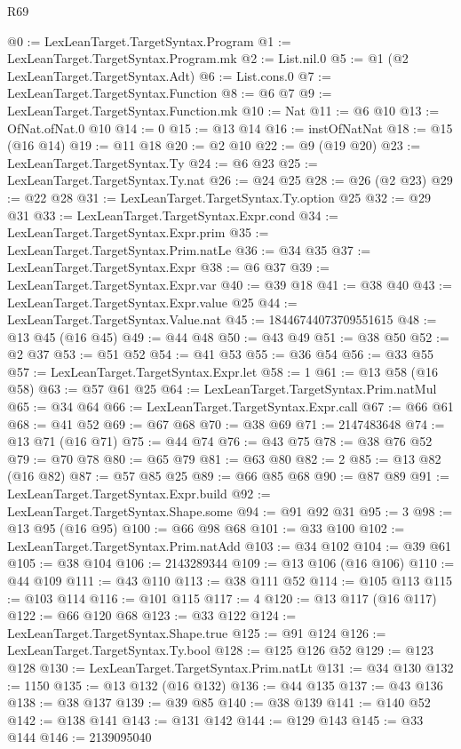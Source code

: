 \begin{lexlean}{R69}
\begin{coremodule}
@0 := LexLeanTarget.TargetSyntax.Program
@1 := LexLeanTarget.TargetSyntax.Program.mk
@2 := List.nil.{0}
@5 := @1 (@2 LexLeanTarget.TargetSyntax.Adt)
@6 := List.cons.{0}
@7 := LexLeanTarget.TargetSyntax.Function
@8 := @6 @7
@9 := LexLeanTarget.TargetSyntax.Function.mk
@10 := Nat
@11 := @6 @10
@13 := OfNat.ofNat.{0} @10
@14 := 0
@15 := @13 @14
@16 := instOfNatNat
@18 := @15 (@16 @14)
@19 := @11 @18
@20 := @2 @10
@22 := @9 (@19 @20)
@23 := LexLeanTarget.TargetSyntax.Ty
@24 := @6 @23
@25 := LexLeanTarget.TargetSyntax.Ty.nat
@26 := @24 @25
@28 := @26 (@2 @23)
@29 := @22 @28
@31 := LexLeanTarget.TargetSyntax.Ty.option @25
@32 := @29 @31
@33 := LexLeanTarget.TargetSyntax.Expr.cond
@34 := LexLeanTarget.TargetSyntax.Expr.prim
@35 := LexLeanTarget.TargetSyntax.Prim.natLe
@36 := @34 @35
@37 := LexLeanTarget.TargetSyntax.Expr
@38 := @6 @37
@39 := LexLeanTarget.TargetSyntax.Expr.var
@40 := @39 @18
@41 := @38 @40
@43 := LexLeanTarget.TargetSyntax.Expr.value @25
@44 := LexLeanTarget.TargetSyntax.Value.nat
@45 := 18446744073709551615
@48 := @13 @45 (@16 @45)
@49 := @44 @48
@50 := @43 @49
@51 := @38 @50
@52 := @2 @37
@53 := @51 @52
@54 := @41 @53
@55 := @36 @54
@56 := @33 @55
@57 := LexLeanTarget.TargetSyntax.Expr.let
@58 := 1
@61 := @13 @58 (@16 @58)
@63 := @57 @61 @25
@64 := LexLeanTarget.TargetSyntax.Prim.natMul
@65 := @34 @64
@66 := LexLeanTarget.TargetSyntax.Expr.call
@67 := @66 @61
@68 := @41 @52
@69 := @67 @68
@70 := @38 @69
@71 := 2147483648
@74 := @13 @71 (@16 @71)
@75 := @44 @74
@76 := @43 @75
@78 := @38 @76 @52
@79 := @70 @78
@80 := @65 @79
@81 := @63 @80
@82 := 2
@85 := @13 @82 (@16 @82)
@87 := @57 @85 @25
@89 := @66 @85 @68
@90 := @87 @89
@91 := LexLeanTarget.TargetSyntax.Expr.build
@92 := LexLeanTarget.TargetSyntax.Shape.some
@94 := @91 @92 @31
@95 := 3
@98 := @13 @95 (@16 @95)
@100 := @66 @98 @68
@101 := @33 @100
@102 := LexLeanTarget.TargetSyntax.Prim.natAdd
@103 := @34 @102
@104 := @39 @61
@105 := @38 @104
@106 := 2143289344
@109 := @13 @106 (@16 @106)
@110 := @44 @109
@111 := @43 @110
@113 := @38 @111 @52
@114 := @105 @113
@115 := @103 @114
@116 := @101 @115
@117 := 4
@120 := @13 @117 (@16 @117)
@122 := @66 @120 @68
@123 := @33 @122
@124 := LexLeanTarget.TargetSyntax.Shape.true
@125 := @91 @124
@126 := LexLeanTarget.TargetSyntax.Ty.bool
@128 := @125 @126 @52
@129 := @123 @128
@130 := LexLeanTarget.TargetSyntax.Prim.natLt
@131 := @34 @130
@132 := 1150
@135 := @13 @132 (@16 @132)
@136 := @44 @135
@137 := @43 @136
@138 := @38 @137
@139 := @39 @85
@140 := @38 @139
@141 := @140 @52
@142 := @138 @141
@143 := @131 @142
@144 := @129 @143
@145 := @33 @144
@146 := 2139095040

\end{coremodule}
\end{lexlean}
